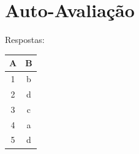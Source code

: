\documentclass[12pt]{article}
\begin{document}
\nocite{*}



\newpage
\section*{Auto-Avaliação}

Respostas:

\begin{table}[H]
    \begin{tabular}{|c|c|} \hline
    \textbf{A} & \textbf{B}\\
    \hline
    1 & b \\ \hline
    2 & d \\ \hline
    3 & c \\ \hline
    4 & a \\ \hline
    5 & d \\ \hline
    \end{tabular}
\end{table}
\end{document}
